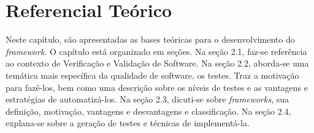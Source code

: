 \chapter[Referencial Teórico]{Referencial Teórico}
Neste capítulo, são apresentadas as bases teóricas para o desenvolvimento do \textit{framework}. O capítulo está organizado em seções. Na seção 2.1, faz-se referência ao contexto de Verificação e Validação de Software. Na seção 2.2, aborda-se uma temática mais específica da qualidade de software, os testes. Traz a motivação para fazê-los, bem como uma descrição sobre os níveis de testes e as vantagens e estratégias de automatizá-los. Na seção 2.3, dicuti-se sobre \textit{frameworks}, sua definição, motivação, vantagens e desvantagens e classificação. Na seção 2.4, explana-se sobre a geração de testes e técnicas de implementá-la.

